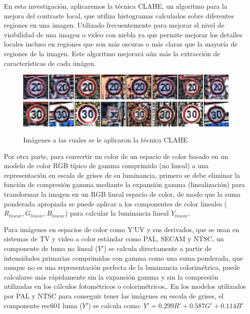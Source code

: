 	En esta investigación, aplicaremos la técnica CLAHE, un algoritmo para la mejora del contraste local, que utiliza histogramas calculados sobre diferentes regiones en una imagen. Utilizado frecuentemente para mejorar el nivel de visibilidad de una imagen o video con niebla ya que permite mejorar los detalles locales incluso en regiones que son más oscuras o más claras que la mayoría de regiones de la imagen. Este algoritmo mejorará aún más la extracción de características de cada imágen.\citep{CLAHE}

		\begin{figure}[H]
		\includegraphics[width=1\textwidth]{images/desarrollo/Normalization_Processing/norm_test1}
		\includegraphics[width=1\textwidth]{images/desarrollo/Normalization_Processing/norm_test2}
		\begin{center}
		\caption{\small{Imágenes a las cuales se le aplicaron la técnica CLAHE }}
		\vspace{-1em}
		{\small{\fontsize{10}{16.8}\selectfont {Fuente propia}}}
		\end{center}
		\vspace{-1.5em}
		\end{figure}

	Por otra parte, para convertir un color de un espacio de color basado en un modelo de color RGB típico de gamma comprimido (no lineal) a una representación en escala de grises de su luminancia, primero se debe eliminar la función de compresión gamma mediante la expansión gamma (linealización) para transformar la imagen en un RGB lineal espacio de color, de modo que la suma ponderada apropiada se puede aplicar a los componentes de color lineales ($R_{linear} , G_{linear} , B_{linear}$) para calcular la luminancia lineal $Y_{linear}$.

	Para imágenes en espacios de color como Y'UV y sus derivados, que se usan en sistemas de TV y video a color estándar como PAL, SECAM y NTSC, un componente de luma no lineal ($Y'$) se calcula directamente a partir de intensidades primarias comprimidas con gamma como una suma ponderada, que aunque no es una representación perfecta de la luminancia colorimétrica, puede calcularse más rápidamente sin la expansión gamma y sin la compresión utilizadas en los cálculos fotométricos o colorimétricos,\citep{POYNTON2003257}. En los modelos utilizados por PAL y NTSC para conseguir tener las imágenes en escala de grises, el componente rec601 luma ($Y'$) se calcula como: \begingroup\makeatletter\def\f@size{14.8}\check@mathfonts	$Y' = 0.299R' + 0.587G' +0.114B'$ \endgroup

